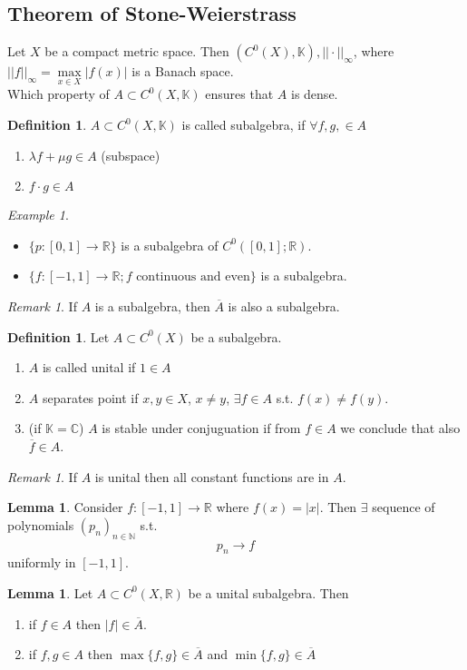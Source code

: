 \documentclass[a4paper, 12pt]{article}
\theoremstyle{plain}
\theoremstyle{definition}
\newtheorem{definition}[theorem]{Definition} %
\theoremstyle{lemma}
\newtheorem{lemma}[theorem]{Lemma}
\theoremstyle{remark}
\newtheorem{remark}[theorem]{Remark}
\theoremstyle{corollary}
\theoremstyle{example}
\newtheorem{example}[theorem]{Example}
\begin{document}
	\subsection{Theorem of Stone-Weierstrass}
	Let $X$ be a compact metric space. Then $(C^0(X), \mathbb{K}), ||\cdot ||_\infty$, where $||f||_\infty = \max\limits_{x \in X} \left|f(x)\right|$ is a Banach space.\\
	Which property of $A \subset C^0(X, \mathbb{K})$ ensures that $A$ is dense.
	\begin{definition}
		$A \subset C^0(X, \mathbb{K})$ is called subalgebra, if $\forall f,g, \in A$ \begin{enumerate}
			\item $\lambda f + \mu g \in A$ (subspace)
			\item $f\cdot g \in A$
		\end{enumerate}
	\end{definition}  
	\begin{example}
		\begin{itemize}
			\item $\{p: [0,1] \to \mathbb{R}\}$ is a subalgebra of $C^0([0,1]; \mathbb{R})$. 
			\item $\{f: [-1,1] \to \mathbb{R}; f\text{ continuous and even}\}$ is a subalgebra.
		\end{itemize}
	\end{example}
	\begin{remark}
		If $A$ is a subalgebra, then $\overline{A}$ is also a subalgebra.
	\end{remark}
	\begin{definition}
		Let $A \subset C^0(X)$ be a subalgebra. \begin{enumerate}
			\item $A$ is called unital if $1 \in A$
			\item $A$ separates point if $x,y \in X$, $x \neq y$, $\exists f \in A$ s.t. $f(x) \neq f(y)$.
			\item (if $\mathbb{K} = \mathbb{C}$) $A$ is stable under conjuguation if from $f \in A$ we conclude that also $\overline{f} \in A$.
		\end{enumerate}
	\end{definition}
	\begin{remark}
		If $A$ is unital then all constant functions are in $A$.
	\end{remark}
	\begin{lemma}
		Consider $f: [-1,1] \to \mathbb{R}$ where $f(x) = \left|x\right|$. Then $\exists$ sequence of polynomials $(p_n)_{n \in \mathbb{N}}$ s.t. \[p_n \to f\] uniformly in $[-1,1]$.
	\end{lemma}
	\begin{lemma}
		Let $A \subset C^0(X, \mathbb{R})$ be a unital subalgebra. Then \begin{enumerate}
			\item if $f \in A$ then $\left|f\right| \in \overline{A}$.
			\item if $f,g \in A$ then $\max\{f,g\} \in \overline{A}$ and $\min\{f,g\} \in \overline{A}$
		\end{enumerate}
	\end{lemma}
	
\end{document}
